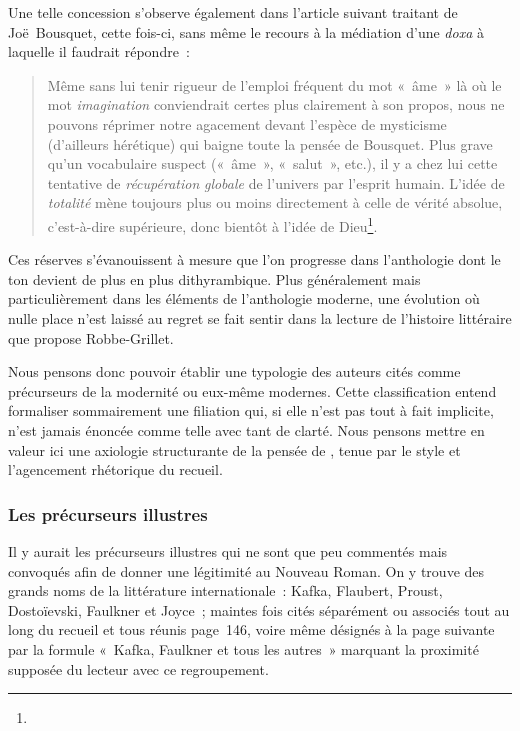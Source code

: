 \documentclass[12pt, a4paper]{article}
\begin{document}
Une telle concession s'observe également dans l'article suivant traitant de Joë~Bousquet, cette fois-ci, sans même le recours à la médiation d'une \textit{doxa} à laquelle il faudrait répondre~:
\begin{quote}
    Même sans lui tenir rigueur de l’emploi fréquent du mot «~âme~» là où le mot \textit{imagination} conviendrait certes plus clairement à son propos, nous ne pouvons réprimer notre agacement devant l’espèce de mysticisme (d’ailleurs hérétique) qui baigne toute la pensée de Bousquet. Plus grave qu’un vocabulaire suspect («~âme~», «~salut~», etc.), il y a chez lui cette tentative de \textit{récupération} \textit{globale} de l’univers par l’esprit humain. L’idée de \textit{totalité} mène toujours plus ou moins directement à celle de vérité absolue, c’est-à-dire supérieure, donc bientôt à l’idée de Dieu\footnote{}.
\end{quote}

Ces réserves s'évanouissent à mesure que l'on progresse dans l'anthologie dont le ton devient de plus en plus dithyrambique. Plus généralement mais particulièrement dans les éléments de l'anthologie moderne, une évolution où nulle place n'est laissé au regret se fait sentir dans la lecture de l'histoire littéraire que propose Robbe-Grillet.

Nous pensons donc pouvoir établir une typologie des auteurs cités comme précurseurs de la modernité ou eux-même modernes. Cette classification entend formaliser sommairement une filiation qui, si elle n'est pas tout à fait implicite, n'est jamais énoncée comme telle avec tant de clarté. Nous pensons mettre en valeur ici une axiologie structurante de la pensée de \punr, tenue par le style et l'agencement rhétorique du recueil.

\subsubsection{Les précurseurs illustres}
Il y aurait les précurseurs illustres qui ne sont que peu commentés mais convoqués afin de donner une légitimité au Nouveau Roman. On y trouve des grands noms de la littérature internationale~: Kafka, Flaubert, Proust, Dostoïevski, Faulkner et Joyce~; maintes fois cités séparément ou associés tout au long du recueil et tous réunis page~146, voire même désignés à la page suivante par la formule «~Kafka, Faulkner et tous les autres~» marquant la proximité supposée du lecteur avec ce regroupement.
\end{document}
